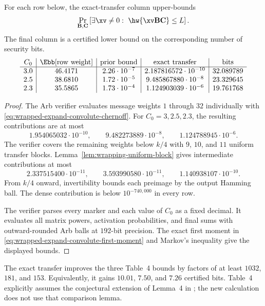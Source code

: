 \begin{theorem}
\label{thm:wrapped-ec-certified-bernoulli-comparison}
For each row below, the exact-transfer column upper-bounds
\[
 \Pr_{\B,\C}\left[
  \exists\xv\neq0:\ \hw{\xv\B\C}\leq L
 \right].
\]
The final column is a certified lower bound on the corresponding number of
security bits.
\[
\begin{array}{c|c|c|c|c}
C_0&\Ebb[\text{row weight}]
 &\text{prior bound}&\text{exact transfer}&\text{bits}\\ \hline
3.0&46.4171&2.26\mathbin{\cdot}10^{-7}
 &2.187816572\mathbin{\cdot}10^{-10}&32.089789\\
2.5&38.6810&1.72\mathbin{\cdot}10^{-5}
 &9.485867880\mathbin{\cdot}10^{-8}&23.329645\\
2.3&35.5865&1.73\mathbin{\cdot}10^{-4}
 &1.124903039\mathbin{\cdot}10^{-6}&19.761768
\end{array}
\]
\end{theorem}

\begin{proof}
The Arb verifier evaluates message weights $1$ through $32$ individually with
\eqref{eq:wrapped-expand-convolute-chernoff}.  For
$C_0=3,2.5,2.3$, the resulting contributions are at most
\[
 1.954065032\mathbin{\cdot}10^{-10},\qquad
 9.482273889\mathbin{\cdot}10^{-8},\qquad
 1.124788945\mathbin{\cdot}10^{-6}.
\]
The verifier covers the remaining weights below $k/4$ with $9$, $10$, and
$11$ uniform transfer blocks.  Lemma~\ref{lem:wrapping-uniform-block} gives
intermediate contributions at most
\[
 2.337515400\mathbin{\cdot}10^{-11},\qquad
 3.593990580\mathbin{\cdot}10^{-11},\qquad
 1.140938107\mathbin{\cdot}10^{-10}.
\]
From $k/4$ onward, invertibility bounds each preimage by the output Hamming
ball.  The dense contribution is below $10^{-740{,}000}$ in every row.

The verifier parses every marker and each value of $C_0$ as a fixed decimal.
It evaluates all matrix powers, activation probabilities, and final sums with
outward-rounded Arb balls at $192$-bit precision.  The exact first moment in
\eqref{eq:wrapped-expand-convolute-first-moment} and Markov's inequality give
the displayed bounds.
\end{proof}

The exact transfer improves the three Table~4 bounds by factors of at least
$1032$, $181$, and $153$.  Equivalently, it gains $10.01$, $7.50$, and $7.26$
certified bits.  Table~4 explicitly assumes the conjectural extension of
Lemma~4 in \cite{EC}; the new calculation does not use that comparison lemma.

